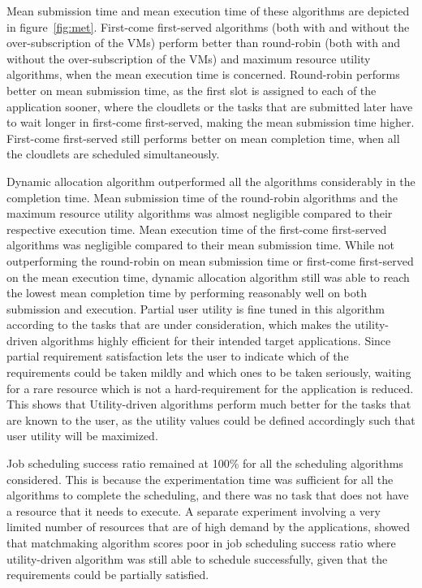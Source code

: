 \documentclass[times, 10pt,twocolumn]{article}
\begin{document}
Mean submission time and mean execution time of these algorithms are depicted in figure~\ref{fig:met}. First-come first-served algorithms (both with and without the over-subscription of the VMs) perform better than round-robin (both with and without the over-subscription of the VMs) and maximum resource utility algorithms, when the mean execution time is concerned. Round-robin performs better on mean submission time, as the first slot is assigned to each of the application sooner, where the cloudlets or the tasks that are submitted later have to wait longer in first-come first-served, making the mean submission time higher. First-come first-served still performs better on mean completion time, when all the cloudlets are scheduled simultaneously.

Dynamic allocation algorithm outperformed all the algorithms considerably in the completion time. Mean submission time of the round-robin algorithms and the maximum resource utility algorithms was almost negligible compared to their respective execution time. Mean execution time of the first-come first-served algorithms was negligible compared to their mean submission time. While not outperforming the round-robin on mean submission time or first-come first-served on the mean execution time, dynamic allocation algorithm still was able to reach the lowest mean completion time by performing reasonably well on both submission and execution. Partial user utility is fine tuned in this algorithm according to the tasks that are under consideration, which makes the utility-driven algorithms highly efficient for their intended target applications. Since partial requirement satisfaction lets the user to indicate which of the requirements could be taken mildly and which ones to be taken seriously, waiting for a rare resource which is not a hard-requirement for the application is reduced. This shows that Utility-driven algorithms perform much better for the tasks that are known to the user, as the utility values could be defined accordingly such that user utility will be maximized. 

Job scheduling success ratio remained at 100\% for all the scheduling algorithms considered. This is because the experimentation time was sufficient for all the algorithms to complete the scheduling, and there was no task that does not have a resource that it needs to execute. A separate experiment involving a very limited number of resources that are of high demand by the applications, showed that matchmaking algorithm scores poor in job scheduling success ratio where utility-driven algorithm was still able to schedule successfully, given that the requirements could be partially satisfied.
\end{document}
